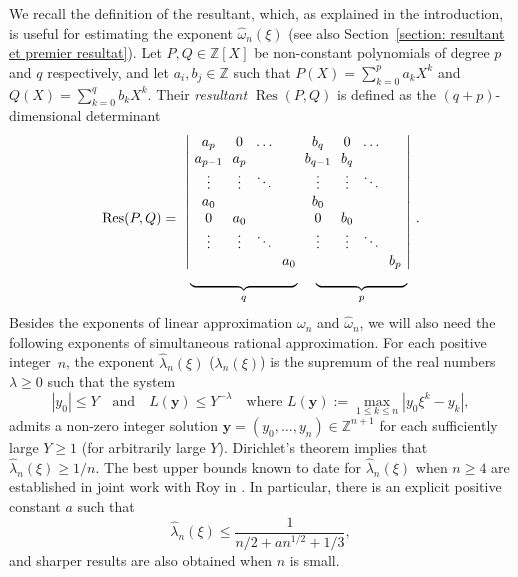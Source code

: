 \documentclass[JEP,XML,SOM,Unicode,NoFloatCountersInSection,published]{cedram}
\DeclareMathOperator\Res{Res}
\newcommand\by{\boldsymbol{y}}
\newcommand\bZ{\mathbb{Z}}
\newcommand\hlambda{\widehat{\lambda}}
\newcommand\homega{\widehat{\omega}}\newcommand\HH{\mathcal{H}}
\newcommand\AND{\quad\text{and}\quad}
\theoremstyle{definition}
\theoremstyle{plain}
\begin{document}
We recall the definition of the resultant, which, as explained in the introduction, is useful for estimating the exponent $\homega_n(\xi)$ (see also Section~\ref{section: resultant et premier resultat}). Let $P,Q\in\bZ[X]$ be non-constant polynomials of degree $p$ and $q$ respectively, and let $a_i,b_j\in \bZ$ such that $P(X) = \sum_{k=0}^{p} a_kX^k$ and $Q(X) = \sum_{k=0}^{q} b_kX^k$.
Their \emph{resultant} $\Res(P,Q)$ is defined as the $(q+p)$-dimensional determinant
\begin{equation}
\label{eq det resultant}
\arraycolsep3.5pt
\Res(P,Q) = \begin{array}{cc}
\left | \begin{array}{cccc}
a_p & 0 & \dots \\
a_{p-1} & a_p & \\
\vdots & \vdots & \ddots \\
a_0 & \\
0 & a_0 \\
\vdots & \vdots & \ddots \\
& & & a_0
\end{array}\right. &
\left. \hspace*{-10pt}
\begin{array}{cccc}
b_q & 0 & \dots \\
b_{q-1} & b_q & \\
\vdots & \vdots & \ddots \\
b_0 & \\
0 & b_0 \\
\vdots & \vdots & \ddots \\
& & & b_p
\end{array}\right| \\
\underbrace{\hspace*{2.7cm}}_{q} &
\underbrace{\hspace*{2.3cm}}_{p}
\end{array}.
\end{equation}
Besides the exponents of linear approximation $\omega_n$ and $\homega_n$, we will also need the following exponents of simultaneous rational approximation. For each positive integer~$n$, the exponent $\hlambda_n(\xi)$ (\resp $\lambda_n(\xi)$) is the supremum of the real numbers $\lambda \geq 0$ such that the system
\begin{equation*}
|y_0| \leq Y \AND L(\by) \leq Y^{-\lambda} \quad \textrm{where } L(\by):=\max_{1\le k \le n} |y_0\xi^k - y_k|,
\end{equation*}
admits a non-zero integer solution $\by=(y_0,\dots,y_n)\in\bZ^{n+1}$ for each sufficiently large $Y\geq 1$ (\resp for arbitrarily large $Y$). Dirichlet's theorem \cite[\S II.1, Th.\,1A]{schmidt1996diophantine} implies that $\hlambda_n(\xi)\geq 1/n$. The best upper bounds known to date for $\hlambda_n(\xi)$ when $n\geq 4$ are established in joint work with Roy in \cite{poels2022simultaneous}. In particular, there is an explicit positive constant $a$ such that
\[
\hlambda_n(\xi) \leq \frac{1}{n/2+an^{1/2}+1/3},
\]
and sharper results are also obtained when $n$ is small.
\end{document}
